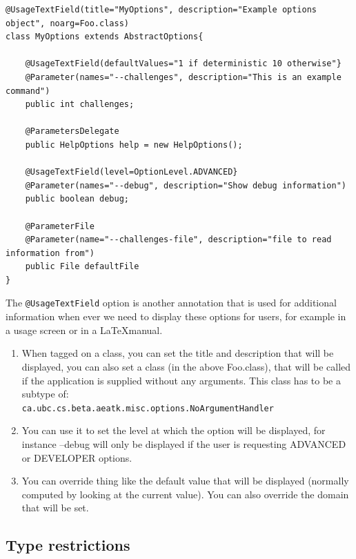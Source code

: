 \documentclass[11pt,letterpaper,oneside]{article}
\begin{document}
\begin{small}
\begin{lstlisting}[]
@UsageTextField(title="MyOptions", description="Example options object", noarg=Foo.class)
class MyOptions extends AbstractOptions{

	@UsageTextField(defaultValues="1 if deterministic 10 otherwise"}
	@Parameter(names="--challenges", description="This is an example command")
	public int challenges;
	
	@ParametersDelegate 
	public HelpOptions help = new HelpOptions();

	@UsageTextField(level=OptionLevel.ADVANCED}
	@Parameter(names="--debug", description="Show debug information")
	public boolean debug;

	@ParameterFile
	@Parameter(name="--challenges-file", description="file to read information from")
	public File defaultFile
}
\end{lstlisting}
\end{small}

The \texttt{@UsageTextField} option is another annotation that is used for additional information when ever we need to display these options for users, for example in a usage screen or in a \LaTeX manual. 

\begin{enumerate} 
\item When tagged on a class, you can set the title and description that will be displayed, you can also set a class (in the above Foo.class), that will be called if the application is supplied without any arguments. This class has to be a subtype of:\\ \texttt{ca.ubc.cs.beta.aeatk.misc.options.NoArgumentHandler}

\item You can use it to set the level at which the option will be displayed, for instance --debug will only be displayed if the user is requesting ADVANCED or DEVELOPER options.

\item You can override thing like the default value that will be displayed (normally computed by looking at the current value). You can also override the domain that will be set.
\end{enumerate}


\subsection{Type restrictions}
\end{document}
